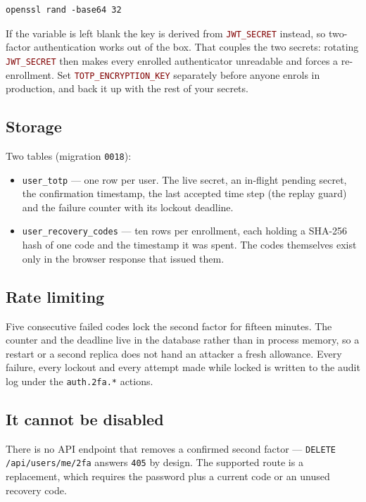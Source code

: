 \documentclass[12pt,a4paper,twoside]{report}
\newcommand{\code}[1]{\texttt{#1}}
\newcommand{\env}[1]{\texttt{\textcolor{Maroon}{#1}}}
\begin{document}
\begin{lstlisting}[style=bash]
openssl rand -base64 32
\end{lstlisting}

If the variable is left blank the key is derived from \env{JWT\_SECRET} instead,
so two-factor authentication works out of the box. That couples the two secrets:
rotating \env{JWT\_SECRET} then makes every enrolled authenticator unreadable and
forces a re-enrollment. Set \env{TOTP\_ENCRYPTION\_KEY} separately before anyone
enrols in production, and back it up with the rest of your secrets.

\subsection*{Storage}

Two tables (migration \code{0018}):

\begin{itemize}
  \item \code{user\_totp} — one row per user. The live secret, an in-flight
        pending secret, the confirmation timestamp, the last accepted time step
        (the replay guard) and the failure counter with its lockout deadline.
  \item \code{user\_recovery\_codes} — ten rows per enrollment, each holding a
        SHA-256 hash of one code and the timestamp it was spent. The codes
        themselves exist only in the browser response that issued them.
\end{itemize}

\subsection*{Rate limiting}

Five consecutive failed codes lock the second factor for fifteen minutes. The
counter and the deadline live in the database rather than in process memory, so a
restart or a second replica does not hand an attacker a fresh allowance. Every
failure, every lockout and every attempt made while locked is written to the
audit log under the \code{auth.2fa.*} actions.

\subsection*{It cannot be disabled}

There is no API endpoint that removes a confirmed second factor —
\code{DELETE /api/users/me/2fa} answers \code{405} by design. The supported
route is a replacement, which requires the password plus a current code or an
unused recovery code.
\end{document}
